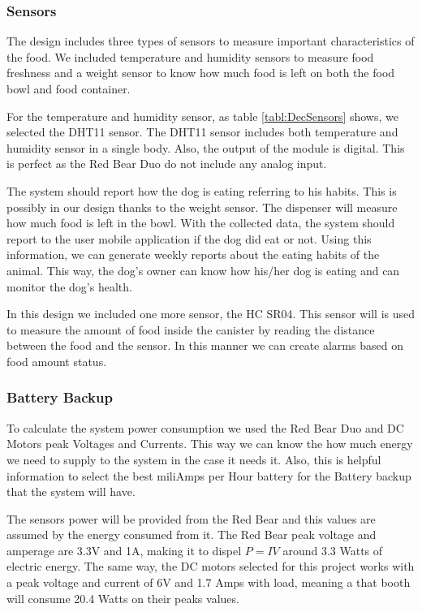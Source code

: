 \documentclass[12pt]{article}
\begin{document}


\subsubsection{Sensors}

The design includes three types of sensors to measure important characteristics of the food. We included temperature and humidity sensors to measure food freshness and a weight sensor to know how much food is left on both the food bowl and food container.

For the temperature and humidity sensor, as table \ref{tabl:DecSensors} shows, we selected the DHT11 sensor. The DHT11 sensor includes both temperature and humidity sensor in a single body. Also, the output of the module is digital. This is perfect as the Red Bear Duo do not include any analog input.

The system should report how the dog is eating referring to his habits. This is possibly in our design thanks to the weight sensor. The dispenser will measure how much food is left in the bowl. With the collected data, the system should report to the user mobile application if the dog did eat or not. Using this information, we can generate weekly reports about the eating habits of the animal. This way, the dog's owner can know how his/her dog is eating and can monitor the dog's health.

In this design we included one more sensor, the HC SR04. This sensor will is used to measure the amount of food inside the canister by reading the distance between the food and the sensor. In this manner we can create alarms based on food amount status.

\subsubsection{Battery Backup}

To calculate the system power consumption we used the Red Bear Duo and DC Motors peak Voltages and Currents. This way we can know the how much energy we need to supply to the system in the case it needs it. Also, this is helpful information to select the best miliAmps per Hour battery for the Battery backup that the system will have.

The sensors power will be provided from the Red Bear and this values are assumed by the energy consumed from it. The Red Bear peak voltage and amperage are 3.3V and 1A, making it to dispel \(P = IV\) around 3.3 Watts of electric energy. The same way, the DC motors selected for this project works with a peak voltage and current of 6V and 1.7 Amps with load, meaning a that booth will consume 20.4 Watts on their peaks values.
\end{document}
